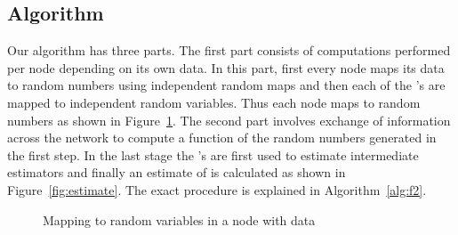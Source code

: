 \documentclass[10pt,twosided,a4paper,draft,onecolumn]{article}
\begin{document}
\subsection{Algorithm}
\label{sec:f2_algo}

Our algorithm has three parts. The first part consists of computations
performed per node depending on its own data. In this part, first
every node  maps its data  to  random numbers  using independent random maps and then each of
the 's are mapped to  independent random variables. Thus
each node  maps  to  random numbers as shown in
Figure~\ref{fig:map}. The second part involves exchange of information
across the network to compute a function  of the random numbers generated in the first step. In
the last stage the 's are first used to estimate intermediate
estimators  and finally an
estimate of  is calculated as shown in Figure~\ref{fig:estimate}.
The exact procedure is explained in Algorithm~\ref{alg:f2}.

\begin{figure}[h]
\begin{center}
\end{center}
\caption{Mapping to  random variables in a node with data }
\label{fig:map}
\end{figure}
\end{document}
